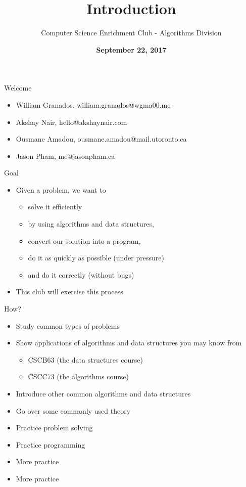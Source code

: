 \documentclass[10pt]{beamer}
\title{Introduction}
\author{Computer Science Enrichment Club - Algorithms Division}
\institute{Department of Computer Science \\[2pt] University of Toronto Scarborough}
\date{\textbf{September 22, 2017}}
\newcommand{\bi}{\begin{itemize}}
\newcommand{\ei}{\end{itemize}}
\begin{document}
\maketitle

\begin{frame}{Welcome}
    \bi
        \item William Granados, {\alert{william.granados@wgma00.me}}
        \item Akshay Nair, {\alert{hello@akshaynair.com}}
        \item Ousmane Amadou, {\alert{ousmane.amadou@mail.utoronto.ca}}
        \item Jason Pham, {\alert{me@jasonpham.ca}}
    \ei
\end{frame}

\begin{frame}{Goal}
    \bi
        \item Given a problem, we want to
            \bi
                \item solve it efficiently
                \item by using algorithms and data structures,
                \item convert our solution into a program,
                \item do it as quickly as possible (under pressure)
                \item and do it correctly (without bugs)
            \ei
        \vspace{20pt}

    \item This club will exercise this process
    \ei
\end{frame}

\begin{frame}{How?}
    \bi
        \item Study common types of problems
        \item Show applications of algorithms and data structures you may know from
	        \bi
		        \item CSCB63 (the data structures course)
		        \item CSCC73 (the algorithms course)
	        \ei
        \item Introduce other common algorithms and data structures
        \item Go over some commonly used theory
        \item Practice problem solving
        \item Practice programming
        \item More practice
        \item More practice
    \ei
\end{frame}
\end{document}
